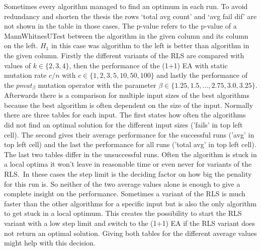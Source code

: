 Sometimes every algorithm managed to find an optimum in each run.
To avoid redundancy and shorten the thesis the rows `total avg count' and `avg fail dif' are not shown in the table in those cases.
The p-value refers to the p-value of a MannWhitnesUTest between the algorithm in the given column and its column on the left.
$H_1$ in this case was algorithm to the left is better than algorithm in the given column.\newline
Firstly the different variants of the RLS are compared with values of $k \in\{2,3,4\}$, then the performance of the (1+1) EA with static mutation rate $c/n$ with $c \in\{1,2,3,5,10,50,100\}$ and lastly the performance of the $pmut_\beta$ mutation operator with the parameter $\beta \in \{1.25, 1.5, \dots, 2.75,3.0,3.25\}$.
Afterwards there is a comparison for multiple input sizes of the best algorithms because the best algorithm is often dependent on the size of the input.
Normally there are three tables for each input.
The first states how often the algorithms did not find an optimal solution for the different input sizes ('fails' in top left cell).
The second gives their average performance for the successful runs ('avg' in top left cell) and the last the performance for all runs ('total avg' in top left cell).
The last two tables differ in the unsuccessful runs.
Often the algorithm is stuck in a local optima it won't leave in reasonable time or even never for variants of the RLS.\ 
In these cases the step limit is the deciding factor on how big the penality for this run is.
So neither of the two average values alone is enough to give a complete insight on the performance.
Sometimes a variant of the RLS is much faster than the other algorithms for a specific input but is also the only algorithm to get stuck in a local optimum.
This creates the possibility to start the RLS variant with a low step limit and switch to the (1+1) EA if the RLS variant does not return an optimal solution.
Giving both tables for the different average values might help with this decision.

